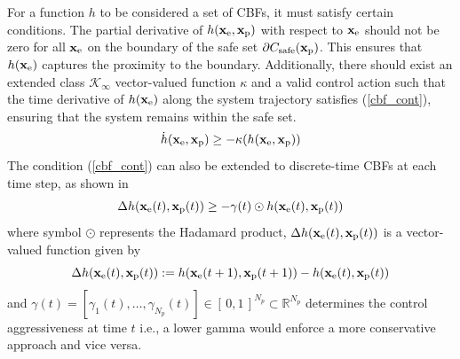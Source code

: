\documentclass[journal]{IEEEtran}
\begin{document}
For a function $h$ to be considered a set of CBFs, it must satisfy certain conditions. The partial derivative of $h(\mathbf{x}_{\rm e},\mathbf{x}_{\rm p})$ with respect to $\mathbf{x}_{\rm e}$ should not be zero for all $\mathbf{x}_{\rm e}$ on the boundary of the safe set $\partial C_{\rm safe}(\mathbf{x}_{\rm p})$. This ensures that $h(\mathbf{x}_{\rm e})$ captures the proximity to the boundary. Additionally, there should exist an extended class $\mathcal{K}_{\infty}$ vector-valued function $\kappa$ and a valid control action such that the time derivative of $h(\mathbf{x}_{\rm e})$ along the system trajectory satisfies (\ref{cbf_cont}), ensuring that the system remains within the safe set.
\begin{equation}
    \dot{h}(\mathbf{x}_{\rm e}, \mathbf{x}_{\rm p}) \geq -\kappa(h(\mathbf{x}_{\rm e}, \mathbf{x}_{\rm p}))   
\label{cbf_cont}
\end{equation}
The condition (\ref{cbf_cont}) can also be extended to discrete-time CBFs \cite{zeng2021mpccbf} at each time step, as shown in 
\begin{equation}
    \Delta h(\mathbf{x}_{\rm e}(t), \mathbf{x}_{\rm p}(t)) \geq -\gamma(t) \odot h(\mathbf{x}_{\rm e}(t), \mathbf{x}_{\rm p}(t))
\label{cbf_discrete}
\end{equation}
where symbol $\odot$ represents the Hadamard product, 
 $\Delta h(\mathbf{x}_{\rm e}(t), \mathbf{x}_{\rm p}(t))$ is a vector-valued function given by
\begin{equation*}
    \Delta h(\mathbf{x}_{\rm e}(t), \mathbf{x}_{\rm p}(t)) := h(\mathbf{x}_{\rm e}(t+1), \mathbf{x}_{\rm p}(t+1)) - h(\mathbf{x}_{\rm e}(t), \mathbf{x}_{\rm p}(t))
\end{equation*}
and $\gamma(t) = [\gamma_1(t), \ldots, \gamma_{N_p}(t)]\in [\,0,1\,]^{N_p}\subset \mathbb{R}^{N_p}$ determines the control aggressiveness at time $t$ i.e., a lower gamma would enforce a more conservative approach and vice versa.
\end{document}
